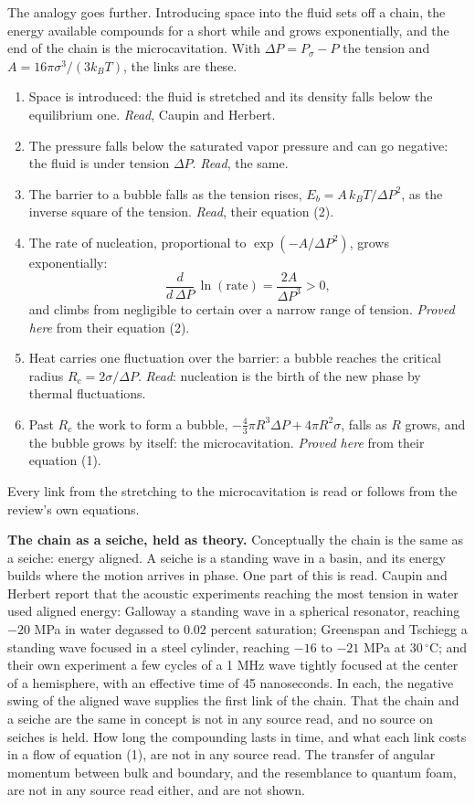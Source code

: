 The analogy goes further. Introducing space into the fluid sets off a chain, the energy available
compounds for a short while and grows exponentially, and the end of the chain is the
microcavitation. With $\Delta P = P_\sigma - P$ the tension and $A = 16\pi\sigma^3/(3k_BT)$, the
links are these.

\begin{enumerate}
\item Space is introduced: the fluid is stretched and its density falls below the equilibrium one.
\emph{Read}, Caupin and Herbert.
\item The pressure falls below the saturated vapor pressure and can go negative: the fluid is under
tension $\Delta P$. \emph{Read}, the same.
\item The barrier to a bubble falls as the tension rises, $E_b = A\,k_BT/\Delta P^2$, as the inverse
square of the tension. \emph{Read}, their equation (2).
\item The rate of nucleation, proportional to $\exp(-A/\Delta P^2)$, grows exponentially:
\[
\frac{d}{d\,\Delta P}\,\ln(\text{rate}) = \frac{2A}{\Delta P^3} > 0 ,
\]
and climbs from negligible to certain over a narrow range of tension. \emph{Proved here} from
their equation (2).
\item Heat carries one fluctuation over the barrier: a bubble reaches the critical radius
$R_c = 2\sigma/\Delta P$. \emph{Read}: nucleation is the birth of the new phase by thermal
fluctuations.
\item Past $R_c$ the work to form a bubble, $-\tfrac43\pi R^3\Delta P + 4\pi R^2\sigma$, falls as $R$
grows, and the bubble grows by itself: the microcavitation. \emph{Proved here} from their
equation (1).
\end{enumerate}

Every link from the stretching to the microcavitation is read or follows from the review's own
equations.

\textbf{The chain as a seiche, held as theory.} Conceptually the chain is the same as a seiche:
energy aligned. A seiche is a standing wave in a basin, and its energy builds where the motion
arrives in phase. One part of this is read. Caupin and Herbert report that the acoustic experiments
reaching the most tension in water used aligned energy: Galloway a standing wave in a spherical
resonator, reaching $-20$ MPa in water degassed to $0.02$ percent saturation; Greenspan and
Tschiegg a standing wave focused in a steel cylinder, reaching $-16$ to $-21$ MPa at
$30\,^\circ$C; and their own experiment a few cycles of a 1 MHz wave tightly focused at the center
of a hemisphere, with an effective time of 45 nanoseconds. In each, the negative swing of the
aligned wave supplies the first link of the chain. That the chain and a seiche are the same in
concept is not in any source read, and no source on seiches is held. How long the compounding lasts in time, and what each link costs in a flow of equation
(1), are not in any source read. The transfer of angular momentum between bulk and boundary, and
the resemblance to quantum foam, are not in any source read either, and are not shown.

